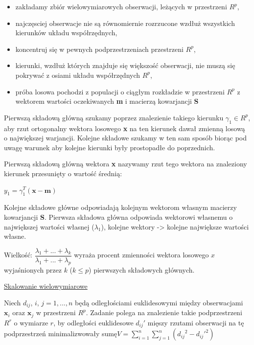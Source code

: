 \begin{itemize}
	\item zakładamy zbiór wielowymiarowych obserwacji, leżących w przestrzeni $ R^p $,
	\item najczęsciej  obserwacje  nie są  równomiernie  rozrzucone wzdłuż wszystkich kierunków układu współrzędnych,
	\item koncentruj się w pewnych podprzestrzeniach przestrzeni $ R^p $,
	\item kierunki, wzdłuż których znajduje się większość obserwacji, nie muszą się pokrywać z osiami układu współrzędnych $ R^p $,
	\item próba losowa pochodzi z populacji o ciągłym rozkładzie w przestrzeni $ R^p $ z wektorem wartości oczekiwanych \textbf{m} i macierzą kowarjancji \textbf{S}
\end{itemize}

Pierwszą składową główną szukamy poprzez znalezienie takiego kierunku $ \gamma_1 \in R^p $, aby rzut ortogonalny wektora losowego \textbf{x} na ten kierunek dawał zmienną losową o największej warjancji. Kolejne składowe szukamy w ten sam sposób biorąc pod uwagę warunek aby kolejne kierunki były prostopadłe do poprzednich.

Pierwszą składową główną wektora \textbf{x} nazywamy rzut tego wektora na znaleziony kierunek przesunięty o wartość średnią:

$ y_1 = \gamma_1^T(\textbf{x} - \textbf{m}) $

Kolejne składowe główne odpowiadają kolejnym wektorom własnym macierzy kowarjancji \textbf{S}. Pierwsza składowa główna odpowiada wektorowi własnemu o największej wartości własnej ($ \lambda_1 $), kolejne wektory -> kolejne największe wartości własne.

Wielkość:\newline
$ \dfrac{\lambda_1 + ... + \lambda_k}{\lambda_1 + ... + \lambda_p} $\newline
wyraża procent zmienności wektora losowego $ x $ wyjaśnionych przez $ k $ ($ k \le p $) pierwszych składowych głównych.

\underline{Skalowanie wielowymiarowe}

Niech $ d_{ij} $, $ i $, $ j = 1, ..., n $ będą odległościami euklidesowymi między obserwacjami $ \textbf{x}_i $  oraz $ \textbf{x}_j $ w przestrzeni $ R^p $. Zadanie polega na znalezienie takie podprzestrzeni $ R^r $ o wymiarze $ r $, by odległości euklidesowe $ d_{ij}' $ mięszy rzutami obserwacji na tę podprzestrzeń minimalizwowały sumę\newline $ V = \sum\limits_{i=1}^n \sum\limits_{j=1}^n ({d_{ij}}^2 - {d_{ij}'}^2) $

